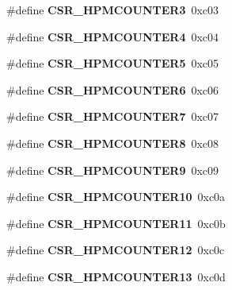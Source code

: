 \begin{DoxyCompactItemize}
\#define {\bfseries C\+S\+R\+\_\+\+H\+P\+M\+C\+O\+U\+N\+T\+E\+R3}~0xc03
\item 
\mbox{\label{riscv-utility_8h_a0507aee7c7c34cc39be1dc2941537b8c}} 
\#define {\bfseries C\+S\+R\+\_\+\+H\+P\+M\+C\+O\+U\+N\+T\+E\+R4}~0xc04
\item 
\mbox{\label{riscv-utility_8h_a74b3354177b841b8d40deab938f48cea}} 
\#define {\bfseries C\+S\+R\+\_\+\+H\+P\+M\+C\+O\+U\+N\+T\+E\+R5}~0xc05
\item 
\mbox{\label{riscv-utility_8h_a63284922fe78d5eb60d66785d6013ee0}} 
\#define {\bfseries C\+S\+R\+\_\+\+H\+P\+M\+C\+O\+U\+N\+T\+E\+R6}~0xc06
\item 
\mbox{\label{riscv-utility_8h_ad9388484f19dc49696c304fb854f67e1}} 
\#define {\bfseries C\+S\+R\+\_\+\+H\+P\+M\+C\+O\+U\+N\+T\+E\+R7}~0xc07
\item 
\mbox{\label{riscv-utility_8h_aef2ced79d58eb46eb505bf1ebb45e78e}} 
\#define {\bfseries C\+S\+R\+\_\+\+H\+P\+M\+C\+O\+U\+N\+T\+E\+R8}~0xc08
\item 
\mbox{\label{riscv-utility_8h_aaf606f32118480e5800c326dae3d072d}} 
\#define {\bfseries C\+S\+R\+\_\+\+H\+P\+M\+C\+O\+U\+N\+T\+E\+R9}~0xc09
\item 
\mbox{\label{riscv-utility_8h_a45c1a1c5872f41cf6b769cac61c594e8}} 
\#define {\bfseries C\+S\+R\+\_\+\+H\+P\+M\+C\+O\+U\+N\+T\+E\+R10}~0xc0a
\item 
\mbox{\label{riscv-utility_8h_ac9c87c7b00208fd2cb1accb2bb06576b}} 
\#define {\bfseries C\+S\+R\+\_\+\+H\+P\+M\+C\+O\+U\+N\+T\+E\+R11}~0xc0b
\item 
\mbox{\label{riscv-utility_8h_a1e4d4f948ba23d5e846ef9e33f548dc6}} 
\#define {\bfseries C\+S\+R\+\_\+\+H\+P\+M\+C\+O\+U\+N\+T\+E\+R12}~0xc0c
\item 
\mbox{\label{riscv-utility_8h_ad60ed530218b142c78f9392ed3b5a4b3}} 
\#define {\bfseries C\+S\+R\+\_\+\+H\+P\+M\+C\+O\+U\+N\+T\+E\+R13}~0xc0d
\item 

\end{DoxyCompactItemize}
